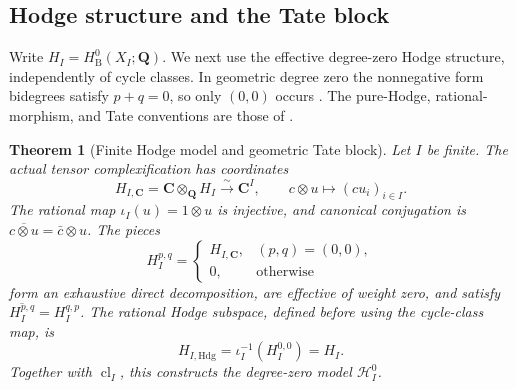 \documentclass[11pt]{article}
\newtheorem{theorem}{Theorem}[section]
\theoremstyle{definition}
\theoremstyle{remark}
\newcommand{\Q}{\mathbf Q}
\begin{document}
\subsection{Hodge structure and the Tate block}

Write \(H_I=H^0_{\mathrm B}(X_I;\Q)\).  We next use the effective
degree-zero Hodge structure, independently of cycle classes.  In geometric
degree zero the nonnegative form bidegrees satisfy \(p+q=0\), so only
\((0,0)\) occurs \cite[\S1]{DeligneHodgeConjecture}.
The pure-Hodge, rational-morphism, and Tate conventions are those of
\cite[\S\S2.1.5--2.1.13]{DeligneHodgeII}.

\begin{theorem}[Finite Hodge model and geometric Tate block]
\label{thm:split-hodge-tate-block}
Let \(I\) be finite.  The actual tensor complexification has coordinates
\[
 H_{I,\mathbf C}=\mathbf C\otimes_{\Q}H_I\xrightarrow{\sim}\mathbf C^I,
 \qquad c\otimes u\longmapsto(cu_i)_{i\in I}.
\]
The rational map \(\iota_I(u)=1\otimes u\) is injective, and canonical
conjugation is \(\overline{c\otimes u}=\bar c\otimes u\).
The pieces
\[
 H_I^{p,q}=
 \begin{cases}H_{I,\mathbf C},&(p,q)=(0,0),\\0,&\text{otherwise}\end{cases}
\]
form an exhaustive direct decomposition, are effective of weight zero,
and satisfy \(\overline{H_I^{p,q}}=H_I^{q,p}\).
The rational Hodge subspace, defined before using the cycle-class map, is
\[
 H_{I,\mathrm{Hdg}}=\iota_I^{-1}(H_I^{0,0})=H_I.
\]
Together with \(\operatorname{cl}_I\), this constructs the degree-zero
model \(\mathscr H_I^0\).


\end{theorem}
\end{document}
